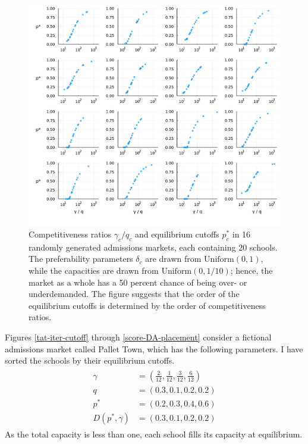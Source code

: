 \documentclass[12pt]{article}
\theoremstyle{definition}
\begin{document}
\begin{figure}
\begin{center}\includegraphics[width=\linewidth, ]{plots/gammaq-pstar.pdf}\end{center}
\captionsetup{singlelinecheck=off}
    \caption[.]{Competitiveness ratios $\gamma_c / q_c$ and equilibrium cutoffs $p_c^*$ in 16 randomly generated admissions markets, each containing 20 schools. The preferability parameters $\delta_c$ are drawn from $\operatorname{Uniform(0, 1)}$, while the capacities are drawn from $\operatorname{Uniform(0, 1/10)}$; hence, the market as a whole has a 50 percent chance of being over- or underdemanded. The figure suggests that the order of the equilibrium cutoffs is determined by the order of competitiveness ratios.}
\label{gammaq-pstar}
\end{figure}

Figures \ref{tat-iter-cutoff} through \ref{score-DA-placement} consider a fictional admissions market called Pallet Town, which has the following parameters. I have sorted the schools by their equilibrium cutoffs.
\begin{gather} \label{pallettowndef}
\begin{aligned}
\gamma &=  \textstyle{\left(\frac{2}{12}, \frac{1}{12}, \frac{3}{12}, \frac{6}{12}\right)}\\
q &= (0.3, 0.1, 0.2, 0.2) \\
p^* &= (0.2, 0.3, 0.4, 0.6)\\
D(p^*, \gamma) &=  (0.3, 0.1, 0.2, 0.2)
\end{aligned}
\end{gather}
As the total capacity is less than one, each school fills its capacity at equilibrium.
\end{document}
